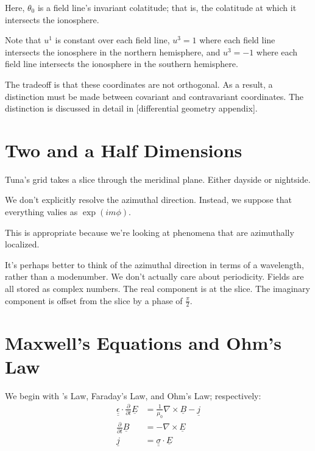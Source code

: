 Here, $\theta_0$ is a field line's invariant colatitude; that is, the
colatitude at which it intersects the ionosphere. 

Note that $u^1$ is constant over each field line, $u^3 = 1$ where each field
line intersects the ionosphere in the northern hemisphere, and $u^3 = -1$ where
each field line intersects the ionosphere in the southern hemisphere. 

The tradeoff is that these coordinates are not orthogonal. As a result, a
distinction must be made between covariant and contravariant coordinates. The
distinction is discussed in detail in [differential geometry appendix].  

\section{Two and a Half Dimensions}

Tuna's grid takes a slice through the meridinal plane. Either dayside or nightside. 

We don't explicitly resolve the azimuthal direction. Instead, we suppose that everything valies as $\exp(i m \phi)$. 

This is appropriate because we're looking at phenomena that are azimuthally localized. 

It's perhaps better to think of the azimuthal direction in terms of a wavelength, rather than a modenumber. We don't actually care about periodicity. 
Fields are all stored as complex numbers. The real component is at the slice. The imaginary component is offset from the slice by a phase of $\frac{\pi}{2}$. 

\section{Maxwell's Equations and Ohm's Law}

We begin with \Ampere's Law, Faraday's Law, and Ohm's Law; respectively: 
\begin{align}
  \underline{ \underline{\epsilon} } \cdot \frac{\partial}{\partial t} \underline{E} & = \frac{1}{\mu_0} \nabla \times \underline{B} - \underline{j} \\
  \frac{\partial}{\partial t} \underline{B} & = - \nabla \times \underline{E} \\
  \underline{j} & = \underline{ \underline{\sigma} } \cdot \underline{E}
\end{align}

